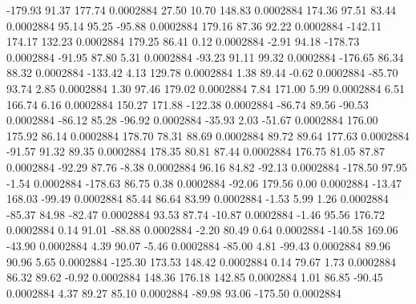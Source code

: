      -179.93       91.37      177.74     0.0002884
       27.50       10.70      148.83     0.0002884
      174.36       97.51       83.44     0.0002884
       95.14       95.25      -95.88     0.0002884
      179.16       87.36       92.22     0.0002884
     -142.11      174.17      132.23     0.0002884
      179.25       86.41        0.12     0.0002884
       -2.91       94.18     -178.73     0.0002884
      -91.95       87.80        5.31     0.0002884
      -93.23       91.11       99.32     0.0002884
     -176.65       86.34       88.32     0.0002884
     -133.42        4.13      129.78     0.0002884
        1.38       89.44       -0.62     0.0002884
      -85.70       93.74        2.85     0.0002884
        1.30       97.46      179.02     0.0002884
        7.84      171.00        5.99     0.0002884
        6.51      166.74        6.16     0.0002884
      150.27      171.88     -122.38     0.0002884
      -86.74       89.56      -90.53     0.0002884
      -86.12       85.28      -96.92     0.0002884
      -35.93        2.03      -51.67     0.0002884
      176.00      175.92       86.14     0.0002884
      178.70       78.31       88.69     0.0002884
       89.72       89.64      177.63     0.0002884
      -91.57       91.32       89.35     0.0002884
      178.35       80.81       87.44     0.0002884
      176.75       81.05       87.87     0.0002884
      -92.29       87.76       -8.38     0.0002884
       96.16       84.82      -92.13     0.0002884
     -178.50       97.95       -1.54     0.0002884
     -178.63       86.75        0.38     0.0002884
      -92.06      179.56        0.00     0.0002884
      -13.47      168.03      -99.49     0.0002884
       85.44       86.64       83.99     0.0002884
       -1.53        5.99        1.26     0.0002884
      -85.37       84.98      -82.47     0.0002884
       93.53       87.74      -10.87     0.0002884
       -1.46       95.56      176.72     0.0002884
        0.14       91.01      -88.88     0.0002884
       -2.20       80.49        0.64     0.0002884
     -140.58      169.06      -43.90     0.0002884
        4.39       90.07       -5.46     0.0002884
      -85.00        4.81      -99.43     0.0002884
       89.96       90.96        5.65     0.0002884
     -125.30      173.53      148.42     0.0002884
        0.14       79.67        1.73     0.0002884
       86.32       89.62       -0.92     0.0002884
      148.36      176.18      142.85     0.0002884
        1.01       86.85      -90.45     0.0002884
        4.37       89.27       85.10     0.0002884
      -89.98       93.06     -175.50     0.0002884
